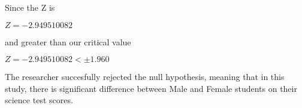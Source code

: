 \documentclass{article}
\begin{document}
    Since the Z is 
    \begin{center}
        $Z=-2.949510082$
    \end{center}
    and greater than our critical value
    \begin{center}
        $Z=-2.949510082<\pm 1.960$
    \end{center}
    The researcher succesfully rejected the null hypothesis, meaning that in this study,
    there is significant difference between Male and Female students on their science test scores.
\end{document}
